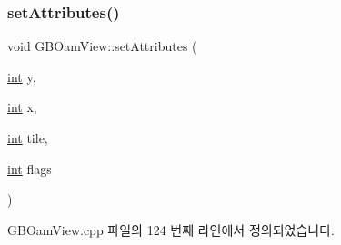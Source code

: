 \subsubsection{\texorpdfstring{set\+Attributes()}{setAttributes()}}
{\footnotesize\ttfamily void G\+B\+Oam\+View\+::set\+Attributes (\begin{DoxyParamCaption}\item[{\mbox{\hyperlink{_util_8cpp_a0ef32aa8672df19503a49fab2d0c8071}{int}}}]{y,  }\item[{\mbox{\hyperlink{_util_8cpp_a0ef32aa8672df19503a49fab2d0c8071}{int}}}]{x,  }\item[{\mbox{\hyperlink{_util_8cpp_a0ef32aa8672df19503a49fab2d0c8071}{int}}}]{tile,  }\item[{\mbox{\hyperlink{_util_8cpp_a0ef32aa8672df19503a49fab2d0c8071}{int}}}]{flags }\end{DoxyParamCaption})}



G\+B\+Oam\+View.\+cpp 파일의 124 번째 라인에서 정의되었습니다.


